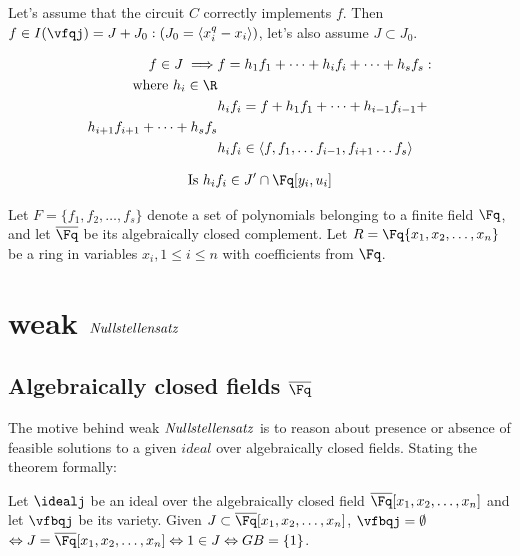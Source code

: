 Let's assume that the circuit $C$ correctly implements $f$. Then $f\in I(\vfqj)=J+J_0: (J_0=\langle x_i^q-x_i\rangle)$, let's also assume $J\subset J_0$.

\begin{align}\label{eq1}
\begin{split}
    f \in J \implies & f = h_1f_1+\dots+h_if_i+\dots+h_sf_s: \\
    \text{where } h_i\in\R\\
    & h_if_i = f + h_1f_1+\dots+h_{i-1}f_{i-1}+\\
    h_{i+1}f_{i+1}+\dots+h_sf_s\\
    & h_if_i \in \langle f,f_1,\dots f_{i-1},f_{i+1}\dots f_s\rangle\\
\end{split}
\end{align}


\begin{align}
	\text{Is } h_if_i \in J' \cap \Fq[y_i,u_i]
\end{align}

Let $F=\{f_1,f_2,\dots,f_s\}$ denote a set of polynomials belonging to a finite field $\Fq$, and let $\overline{\Fq}$ be its algebraically closed complement. Let $R = \Fq\{x_1,x_2,\dots,x_n\}$ be a ring in variables $x_i, 1\le i\le n$ with coefficients from $\Fq$. 

\section{weak ${\it{Nullstellensatz}}$}
\subsection{Algebraically closed fields $\overline{\Fq}$}

The motive behind weak $\it{Nullstellensatz}$ is to reason about presence or absence of feasible solutions to a given $ideal$ over algebraically closed fields. Stating the theorem formally:

\begin{Theorem}
Let $\idealj$ be an ideal over the algebraically closed field $\overline{\Fq}[x_1,x_2,\dots,x_n]$ and let $\vfbqj$ be its variety. Given $J\subset\overline{\Fq}[x_1,x_2,\dots,x_n]$, $\vfbqj = \emptyset$ $\Leftrightarrow J=\overline{\Fq}[x_1,x_2,\dots,x_n] \Leftrightarrow 1 \in J \Leftrightarrow GB=\{1\}$.
\end{Theorem}

